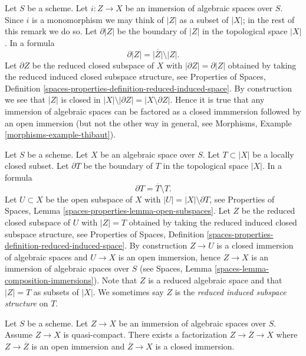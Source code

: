 \begin{remark}
\label{remark-immersion}
Let $S$ be a scheme. Let $i : Z \to X$ be an immersion of algebraic
spaces over $S$. Since $i$ is a monomorphism we may think of $|Z|$ as
a subset of $|X|$; in the rest of this remark we do so.
Let $\partial |Z|$ be the boundary of $|Z|$ in
the topological space $|X|$. In a formula
$$
\partial |Z| = \overline{|Z|} \setminus |Z|.
$$
Let $\partial Z$ be the reduced closed subspace of $X$ with
$|\partial Z| = \partial |Z|$
obtained by taking the reduced induced closed subspace structure, see
Properties of Spaces,
Definition \ref{spaces-properties-definition-reduced-induced-space}.
By construction we see that $|Z|$ is closed in
$|X| \setminus |\partial Z| = |X \setminus \partial Z|$.
Hence it is true that any immersion of algebraic spaces can be
factored as a closed immmersion followed by an open immersion
(but not the other way in general, see
Morphisms, Example \ref{morphisms-example-thibaut}).
\end{remark}

\begin{remark}
\label{remark-space-structure-locally-closed-subset}
Let $S$ be a scheme. Let $X$ be an algebraic space over $S$.
Let $T \subset |X|$ be a locally closed subset.
Let $\partial T$ be the boundary of $T$ in
the topological space $|X|$. In a formula
$$
\partial T = \overline{T} \setminus T.
$$
Let $U \subset X$ be the open subspace of $X$ with
$|U| = |X| \setminus \partial T$, see
Properties of Spaces, Lemma \ref{spaces-properties-lemma-open-subspaces}.
Let $Z$ be the reduced closed subspace of $U$ with
$|Z| = T$ obtained by taking the reduced induced
closed subspace structure, see
Properties of Spaces,
Definition \ref{spaces-properties-definition-reduced-induced-space}.
By construction $Z \to U$ is a closed immersion of algebraic spaces
and $U \to X$ is an open immersion, hence
$Z \to X$ is an immersion of algebraic spaces over $S$ (see
Spaces, Lemma \ref{spaces-lemma-composition-immersions}).
Note that $Z$ is a reduced algebraic space and that
$|Z| = T$ as subsets of $|X|$. We sometimes say
$Z$ is the {\it reduced induced subspace structure} on $T$.
\end{remark}

\begin{lemma}
\label{lemma-factor-the-other-way}
Let $S$ be a scheme. Let $Z \to X$ be an immersion of algebraic spaces over
$S$. Assume $Z \to X$ is quasi-compact.
There exists a factorization $Z \to \overline{Z} \to X$ where
$Z \to \overline{Z}$ is an open immersion and $\overline{Z} \to X$
is a closed immersion.
\end{lemma}

